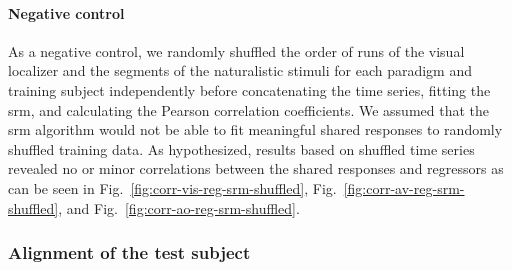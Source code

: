 \paragraph{Negative control}


As a negative control, we randomly shuffled the order of runs of the visual
localizer and the segments of the naturalistic stimuli for each paradigm and
training subject independently before concatenating the time series, fitting the
\ac{srm}, and calculating the Pearson correlation coefficients.
%
We assumed that the \ac{srm} algorithm would not be able to fit meaningful
shared responses to randomly shuffled training data.
%
As hypothesized, results based on shuffled time series revealed no or minor
correlations between the shared responses and regressors as can be seen in
Fig.~\ref{fig:corr-vis-reg-srm-shuffled},
Fig.~\ref{fig:corr-av-reg-srm-shuffled}, and
Fig.~\ref{fig:corr-ao-reg-srm-shuffled}.





\subsubsection{Alignment of the test subject}




